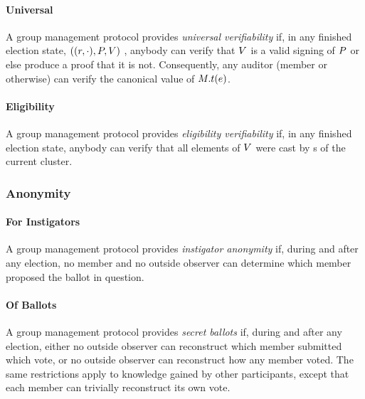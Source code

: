   \paragraph{Universal}
  A group management protocol provides \emph{universal verifiability} if, in any
  finished election state, $((r, \cdot), P, V)$ , anybody can
  verify that $V$ is a valid signing of $P$ or else produce a
  proof that it is not. Consequently, any auditor (member or otherwise) can
  verify the canonical value of $M.t(e)$.

  \paragraph{Eligibility}
  A group management protocol provides \emph{eligibility verifiability} if, in
  any finished election state, anybody can verify that all elements of
  $V$ were cast by \KwMember s of the current cluster.

  \subsubsection{Anonymity}
  \paragraph{For Instigators}
  A group management protocol provides \emph{instigator anonymity} if, during
  and after any election, no member and no outside observer can determine
  which member proposed the ballot in question.

  \paragraph{Of Ballots}
  A group management protocol provides \emph{secret ballots} if, during and
  after any election, either no outside observer can reconstruct which member
  submitted which vote, or no outside observer can reconstruct how any
  member voted. The same restrictions apply to knowledge gained by other
  participants, except that each member can trivially reconstruct its own vote.

%
